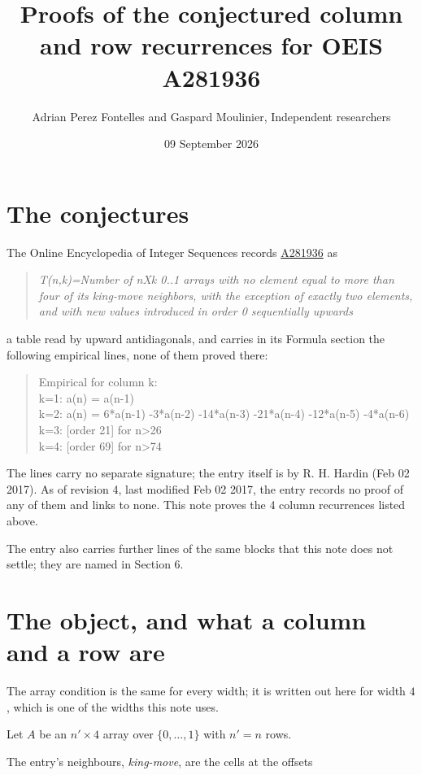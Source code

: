 \documentclass[11pt]{article}
\title{Proofs of the conjectured column and row recurrences for OEIS A281936}
\author{Adrian Perez Fontelles and Gaspard Moulinier, Independent researchers}
\date{09 September 2026}
\theoremstyle{definition}
\begin{document}
\maketitle
\section{The conjectures}

The Online Encyclopedia of Integer Sequences records \href{https://oeis.org/A281936}{A281936} as

\begin{quote}\itshape T(n,k)=Number of nXk 0..1 arrays with no element equal to more than four of its king-move neighbors, with the exception of exactly two elements, and with new values introduced in order 0 sequentially upwards\end{quote}

a table read by upward antidiagonals, and carries in its Formula section the following empirical lines, none of them proved there:

\begin{quote}\ttfamily Empirical for column k:\\
k=1: a(n) = a(n-1)\\k=2: a(n) = 6*a(n-1) -3*a(n-2) -14*a(n-3) -21*a(n-4) -12*a(n-5) -4*a(n-6)\\k=3: [order 21] for n>26\\k=4: [order 69] for n>74\end{quote}

The lines carry no separate signature; the entry itself is by R. H. Hardin (Feb 02 2017). As of revision 4, last modified Feb 02 2017, the entry records no proof of any of them and links to none. This note proves the 4 column recurrences listed above.

The entry also carries further lines of the same blocks that this note does not settle; they are named in Section 6.

\section{The object, and what a column and a row are}

The array condition is the same for every width; it is written out here for width $4$, which is one of the widths this note uses.

Let $A$ be an $n' \times 4$ array over $\{0,\dots,1\}$ with $n' = n$ rows.

The entry's neighbours, {\itshape king-move}, are the cells at the offsets
\end{document}
